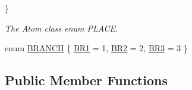 \begin{DoxyCompactItemize}
 \}
\begin{DoxyCompactList}\small\item\em The Atom class enum P\-L\-A\-C\-E. \end{DoxyCompactList}\item 
enum \hyperlink{classCAtom_a59319a3892af30a3b184bcd0c407a273}{B\-R\-A\-N\-C\-H} \{ \hyperlink{classCAtom_a59319a3892af30a3b184bcd0c407a273a8f61dc1646c6d790eb50c727d454c4e9}{B\-R1} =  1, 
\hyperlink{classCAtom_a59319a3892af30a3b184bcd0c407a273a3fe98bcd10670b758a0515ff4bf8bd07}{B\-R2} =  2, 
\hyperlink{classCAtom_a59319a3892af30a3b184bcd0c407a273ac5ba63a26ac3523f677471e9b33058d2}{B\-R3} =  3
 \}
\end{DoxyCompactItemize}
\subsection*{Public Member Functions}
